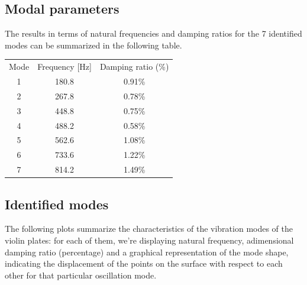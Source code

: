 \documentclass[a4paper,12pt,oneside]{article}
\begin{document}
\subsection{Modal parameters}

The results in terms of natural frequencies and damping ratios for the 7 identified modes can be summarized in the following table.

\begin{table}[H]
	\centering
	\begin{tabular}{ccc}
		Mode	& Frequency {[}Hz{]}	& Damping ratio (\%) \\
		1		& 180.8						& 0.91\% \\
		2		& 267.8						& 0.78\% \\
		3		& 448.8						& 0.75\% \\
		4		& 488.2						& 0.58\% \\
		5		& 562.6						& 1.08\% \\
		6		& 733.6						& 1.22\% \\
		7		& 814.2						& 1.49\%
	\end{tabular}
\end{table}

\subsection{Identified modes}

The following plots summarize the characteristics of the vibration modes of the violin plates: for each of them, we're displaying natural frequency, adimensional damping ratio (percentage) and a graphical representation of the mode shape, indicating the displacement of the points on the surface with respect to each other for that particular oscillation mode.
\end{document}
